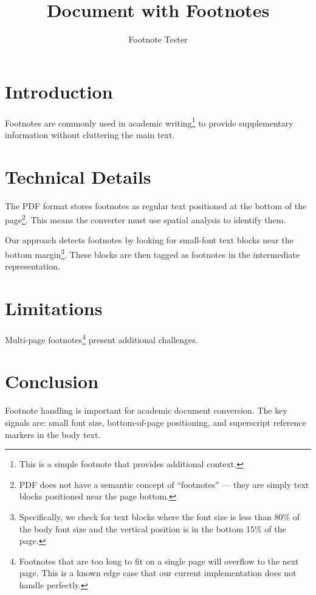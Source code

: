 \documentclass[12pt]{article}
\title{Document with Footnotes}
\author{Footnote Tester}
\begin{document}
\maketitle

\section{Introduction}
Footnotes are commonly used in academic writing\footnote{This is a simple
footnote that provides additional context.} to provide supplementary information
without cluttering the main text.

\section{Technical Details}
The PDF format stores footnotes as regular text positioned at the bottom of the
page\footnote{PDF does not have a semantic concept of ``footnotes'' --- they are
simply text blocks positioned near the page bottom.}. This means the converter
must use spatial analysis to identify them.

Our approach detects footnotes by looking for small-font text blocks near the
bottom margin\footnote{Specifically, we check for text blocks where the font
size is less than 80\% of the body font size and the vertical position is in
the bottom 15\% of the page.}. These blocks are then tagged as footnotes in the
intermediate representation.

\section{Limitations}
Multi-page footnotes\footnote{Footnotes that are too long to fit on a single
page will overflow to the next page. This is a known edge case that our current
implementation does not handle perfectly.} present additional challenges.

\section{Conclusion}
Footnote handling is important for academic document conversion. The key signals
are: small font size, bottom-of-page positioning, and superscript reference markers
in the body text.
\end{document}
